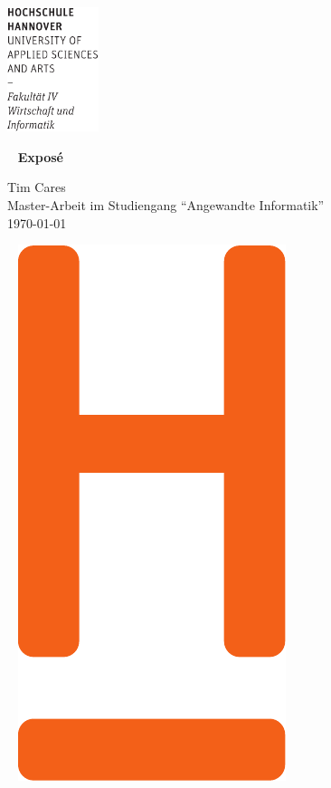 \documentclass[fontsize=12pt,paper=a4,twoside=semi,parskip=half-,headsepline,headinclude]{scrreprt}
\begin{document}
  \thispagestyle{empty} %
\includegraphics[width=0.2\textwidth]{Wortmarke_WI_schwarz}

   {  ~ \sffamily
  \vfill
  {\Huge\bfseries Exposé}
  \bigskip

  {\Large 
  Tim Cares \\[2ex]
 Master-Arbeit im Studiengang "`Angewandte Informatik"' 
 \\[5ex]
   \today } 
}
 \vfill
  
  ~ \hfill
  \includegraphics[height=0.3\paperheight]{H_WI_Pantone1665} 

\vspace*{-3cm}
\end{document}
